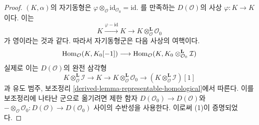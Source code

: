 \begin{proof}
$(K, \alpha)$의 자기동형은
$\varphi \otimes_\mathcal{O} \text{id}_{\mathcal{O}_0} = \text{id}$.
를 만족하는 $D(\mathcal{O})$의 사상 $\varphi : K \to K$이다.
이는
$$
K \xrightarrow{\varphi - \text{id}} K \to
K \otimes_\mathcal{O}^\mathbf{L} \mathcal{O}_0
$$
가 영이라는 것과 같다. 따라서 자기동형군은 다음 사상의 여핵이다.
$$
\mathop{\mathrm{Hom}}\nolimits_\mathcal{O}(K, K_0[-1])
\longrightarrow
\mathop{\mathrm{Hom}}\nolimits_\mathcal{O}(K, K_0 \otimes_{\mathcal{O}_0}^\mathbf{L} \mathcal{I})
$$
실제로 이는 $D(\mathcal{O})$의 완전 삼각형
$$
K \otimes_\mathcal{O}^\mathbf{L} \mathcal{I} \to
K \to
K \otimes_\mathcal{O}^\mathbf{L} \mathcal{O}_0 \to
(K \otimes_\mathcal{O}^\mathbf{L} \mathcal{I})[1]
$$
과 유도 범주, 보조정리 \ref{derived-lemma-representable-homological}에서
따른다. 이를 보조정리에 나타난 군으로 옮기려면 제한 함자
$D(\mathcal{O}_0) \to D(\mathcal{O})$와
$- \otimes_\mathcal{O} \mathcal{O}_0 : D(\mathcal{O}) \to D(\mathcal{O}_0)$
사이의 수반성을 사용한다. 이로써 (1)이 증명되었다.


\end{proof}
